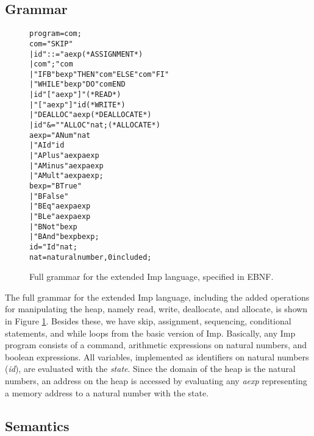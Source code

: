 \subsection{Grammar}

\begin{figure}
\begin{alltt}
                  program = com ;
                  com =   "SKIP"
                        | id "::=" aexp            (* ASSIGNMENT *)
                        | com ";" com
                        | "IFB" bexp "THEN" com "ELSE" com "FI"
                        | "WHILE" bexp "DO" com END
                        | id \lsquigarr "[" aexp "]"       (* READ *)
                        | "[" aexp "]" \lsquigarr id       (* WRITE *)
                        | "DEALLOC" aexp           (* DEALLOCATE *)
                        | id "&=" "ALLOC" nat ;    (* ALLOCATE *)
                  aexp =  "ANum" nat
                        | "AId" id
                        | "APlus" aexp aexp
                        | "AMinus" aexp aexp
                        | "AMult" aexp aexp ;
                  bexp =  "BTrue"
                        | "BFalse"
                        | "BEq" aexp aexp
                        | "BLe" aexp aexp
                        | "BNot" bexp
                        | "BAnd" bexp bexp ;
                  id = "Id" nat ;
                  nat = natural number, 0 included ;
\end{alltt}
\caption{Full grammar for the extended Imp language, specified in EBNF.}
\label{fig:imp_grammar}
\end{figure}

The full grammar for the extended Imp language, including the added operations for manipulating the heap, namely read, write, deallocate, and allocate, is shown in Figure \ref{fig:imp_grammar}. Besides these, we have skip, assignment, sequencing, conditional statements, and while loops from the basic version of Imp. Basically, any Imp program consists of a command, arithmetic expressions on natural numbers, and boolean expressions. All variables, implemented as identifiers on natural numbers ({\it id}), are evaluated with the {\it state}. Since the domain of the heap is the natural numbers, an address on the heap is accessed by evaluating any {\it aexp} representing a memory address to a natural number with the state.

\subsection{Semantics}

